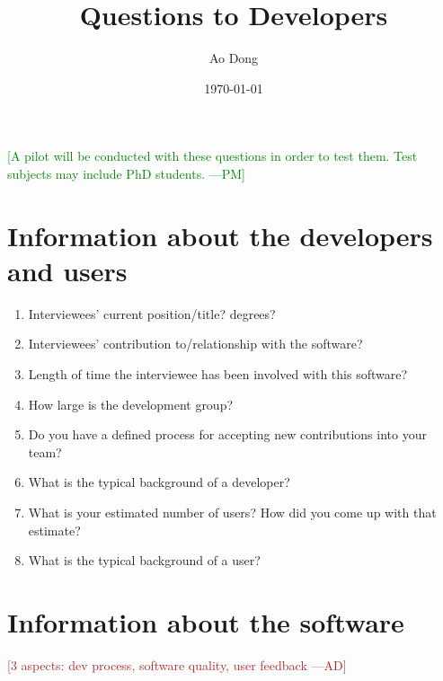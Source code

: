 \documentclass[12pt]{article}
\title{Questions to Developers}
\author{Ao Dong}
\date{\today}
\newcommand{\authornote}[3]{\textcolor{#1}{[#3 ---#2]}}
\newcommand{\authornote}[3]{}
\newcommand{\pmi}[1]{\authornote{green}{PM}{#1}} %
\newcommand{\ad}[1]{\authornote{brown}{AD}{#1}} %
\begin{document}
\maketitle
\pmi{A pilot will be conducted with these questions in order to test them. Test subjects may include PhD students.}
\section{Information about the developers and users}\citep{Jegatheesan2016}
\begin{enumerate}
\item Interviewees' current position/title? degrees?
\item Interviewees' contribution to/relationship with the software?
\item Length of time the interviewee has been involved with this software?
\item How large is the development group?
\item Do you have a defined process for accepting new contributions into your team?
\item What is the typical background of a developer?
\item What is your estimated number of users? How did you come up with that estimate?
\item What is the typical background of a user?
\end{enumerate}

\section{Information about the software}

\noindent\ad{3 aspects: dev process, software quality, user feedback}
\end{document}
